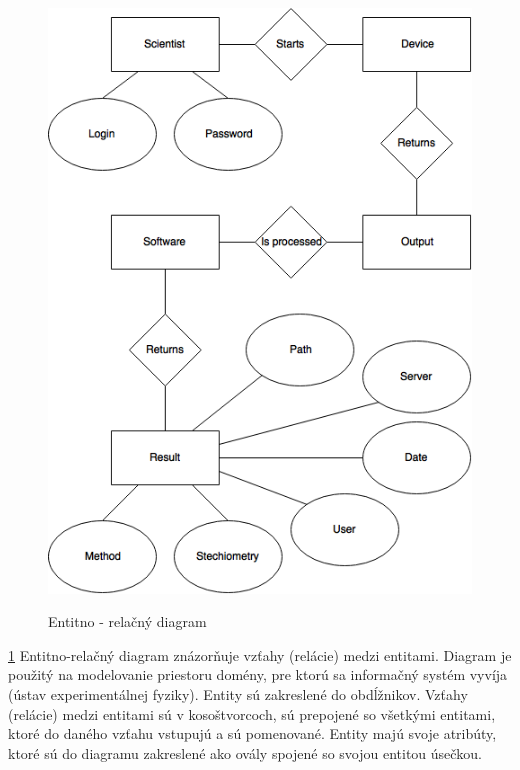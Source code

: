 \documentclass[12pt,a4paper]{article}
\begin{document}
\begin{figure}[H]
	\caption{Entitno - relačný diagram}
	\includegraphics[width=\textwidth]{er_diagram}
	\label{fig:er_diagram}
\end{figure}
\ref{fig:er_diagram}
Entitno-relačný diagram znázorňuje vzťahy (relácie) medzi entitami. Diagram je použitý na modelovanie priestoru domény, pre ktorú sa informačný systém vyvíja (ústav experimentálnej fyziky). Entity sú zakreslené do obdĺžnikov. Vzťahy (relácie) medzi entitami sú v kosoštvorcoch, sú prepojené so všetkými entitami, ktoré do daného vzťahu vstupujú a sú pomenované. Entity majú svoje atribúty, ktoré sú do diagramu zakreslené ako ovály spojené so svojou entitou úsečkou.
\end{document}
